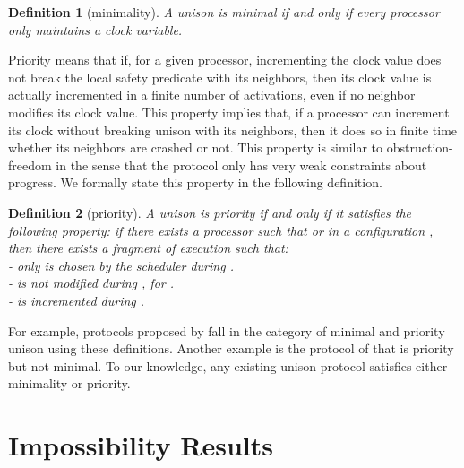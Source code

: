 \documentclass[11pt,english,letterpaper]{article}
\newtheorem{definition}{Definition}
\begin{document}
\begin{definition}[minimality]
A unison is \emph{minimal} if and only if every processor only maintains a clock variable.
\end{definition}

Priority means that if, for a given processor, incrementing the clock value does not break the local safety predicate with its neighbors, then its clock value is actually incremented in a finite number of activations, even if no neighbor modifies its clock value. This property implies that, if a processor can increment its clock without breaking unison with its neighbors, then it does so in finite time whether its neighbors are crashed or not. This property is similar to obstruction-freedom in the sense that the protocol only has very weak constraints about progress. We formally state this property in the following definition.

\begin{definition}[priority]
A unison is \emph{priority} if and only if it satisfies the following property: if there exists a processor  such that  or  in a configuration , then there exists a fragment of execution  such that:\\
\indent - only  is chosen by the scheduler during .\\
\indent -  is not modified during , for .\\
\indent -  is incremented during .
\end{definition}
	
For example, protocols proposed by \cite{BPV04c,BPV05c,CFG92c,GH90j} fall in the category of minimal and priority unison using these definitions. Another example is the protocol of \cite{PT97j} that is priority but not minimal. To our knowledge, any existing unison protocol satisfies either minimality or priority.

\section{Impossibility Results}\label{sec:negative}
\end{document}
